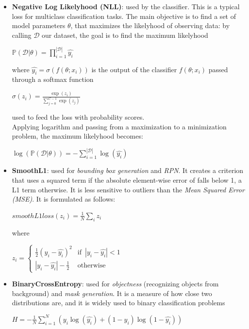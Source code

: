\documentclass[10pt,twocolumn,letterpaper]{article}
\begin{document}
  \begin{itemize}
    \item \textbf{Negative Log Likelyhood (NLL)}: used by the classifier. 
      This is a typical loss for multiclass classification tasks.
      The main objective is to find a set of model parameters $\theta$,
      that maximizes the likelyhood of observing data:
      by calling $\mathcal{D}$ our dataset, the goal is to find 
      the maximum likelyhood 
      \begin{center}
        $\mathbb{P}(\mathcal{D}|\theta) = \prod_{i=1}^{|\mathcal{D}|}\hat{y_i}$
      \end{center}
      where $\hat{y_i} = \sigma(f(\theta;x_i))$ is the output of the classifier
       $f(\theta;x_i)$ passed through a softmax function
       \begin{center}
        $\sigma(z_i) = \frac{\exp(z_i)}{\sum_{j=0}^{C-1}\exp(z_j)}$
       \end{center}
       used to feed the loss with probability scores.
       \\Applying logarithm and passing from a maximization to a minimization problem,
       the maximum likelyhood becomes:
       \begin{center}
        $\log(\mathbb{P}(\mathcal{D}|\theta)) = - \sum_{i=1}^{|\mathcal{D}|}\log(\hat{y_i})$
       \end{center}
    \item \textbf{SmoothL1}: used for \textit{bounding box generation} and \textit{RPN}. 
       It creates a criterion that uses a squared term if the absolute
       element-wise error of falls below 1, a L1 term otherwise.
       \newpage It is less sensitive to outliers than the \textit{Mean Squared Error (MSE)}.
       It is formulated as follows:
       \begin{center}
        $smoothL1loss(z_i)=\frac{1}{N} \sum_{i}z_i$
       \end{center}
       where
       \begin{center}
        $z_i = \begin{cases}
          \frac{1}{2}(y_i - \hat{y_i})^2 & \mbox{if} \,\,\, |y_i - \hat{y_i}| < 1\\
          |y_i - \hat{y_i}| -  \frac{1}{2} &  \mbox{otherwise}
        \end{cases}$
       \end{center} 

    \item \textbf{BinaryCrossEntropy}: used for \textit{objectness}
     (recognizing objects from background) and \textit{mask generation}.
     It is a measure of how close two distributions are, and 
     it is widely used to binary classification problems
     \begin{center}
      $ H = - \frac{1}{N} \sum_{i=1}^{N}(y_i \log(\hat{y_i}) + (1 - y_i)
      \log(1-\hat{y_i}))$
     \end{center}
  \end{itemize}
\end{document}

